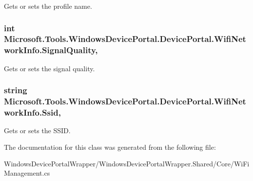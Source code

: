 Gets or sets the profile name. 

\subsubsection[{\texorpdfstring{Signal\+Quality}{SignalQuality}}]{\setlength{\rightskip}{0pt plus 5cm}int Microsoft.\+Tools.\+Windows\+Device\+Portal.\+Device\+Portal.\+Wifi\+Network\+Info.\+Signal\+Quality\hspace{0.3cm}{\ttfamily [get]}, {\ttfamily [set]}}\hypertarget{class_microsoft_1_1_tools_1_1_windows_device_portal_1_1_device_portal_1_1_wifi_network_info_a2ca448a6edb3046da8bb016f27ce794f}{}\label{class_microsoft_1_1_tools_1_1_windows_device_portal_1_1_device_portal_1_1_wifi_network_info_a2ca448a6edb3046da8bb016f27ce794f}


Gets or sets the signal quality. 

\subsubsection[{\texorpdfstring{Ssid}{Ssid}}]{\setlength{\rightskip}{0pt plus 5cm}string Microsoft.\+Tools.\+Windows\+Device\+Portal.\+Device\+Portal.\+Wifi\+Network\+Info.\+Ssid\hspace{0.3cm}{\ttfamily [get]}, {\ttfamily [set]}}\hypertarget{class_microsoft_1_1_tools_1_1_windows_device_portal_1_1_device_portal_1_1_wifi_network_info_a75d602d08251f72a1508659a3ae8d611}{}\label{class_microsoft_1_1_tools_1_1_windows_device_portal_1_1_device_portal_1_1_wifi_network_info_a75d602d08251f72a1508659a3ae8d611}


Gets or sets the S\+S\+ID. 



The documentation for this class was generated from the following file\+:\begin{DoxyCompactItemize}
\item 
Windows\+Device\+Portal\+Wrapper/\+Windows\+Device\+Portal\+Wrapper.\+Shared/\+Core/Wi\+Fi\+Management.\+cs\end{DoxyCompactItemize}
